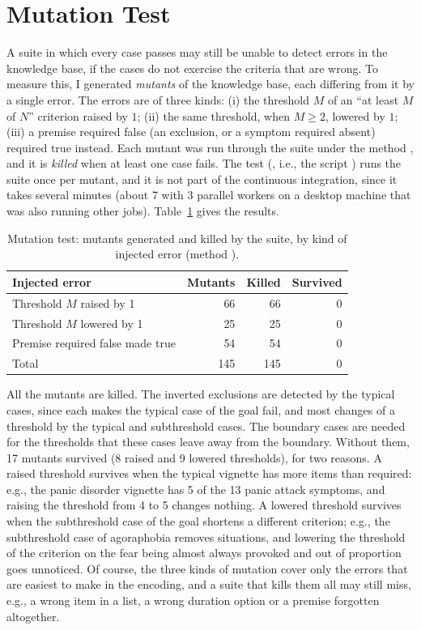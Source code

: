 \section{Mutation Test}
\label{sec:mutation}

A suite in which every case passes may still be unable to detect errors in the
knowledge base, if the cases do not exercise the criteria that are wrong. To
measure this, I generated \emph{mutants} of the knowledge base, each differing
from it by a single error. The errors are of three kinds: (i) the threshold $M$
of an ``at least $M$ of $N$'' criterion raised by $1$; (ii) the same threshold,
when $M \ge 2$, lowered by $1$; (iii) a premise required false (an exclusion, or
a symptom required absent) required true instead. Each mutant was run through
the suite under the method , and it is \emph{killed} when at least one
case fails. The test (, i.e., the script )
runs the suite once per mutant, and it is not part of the continuous
integration, since it takes several minutes (about 7 with 3 parallel workers on
a desktop machine that was also running other jobs).
Table~\ref{tab:mutation} gives the results.

\begin{table}[ht]
\centering
\caption{Mutation test: mutants generated and killed by the suite, by kind of
injected error (method ).}
\label{tab:mutation}
\small
\begin{tabular}{@{}lrrr@{}}
\toprule
\textbf{Injected error} & \textbf{Mutants} & \textbf{Killed} & \textbf{Survived} \\
\midrule
Threshold $M$ raised by 1 & 66 & 66 & 0 \\
Threshold $M$ lowered by 1 & 25 & 25 & 0 \\
Premise required false made true & 54 & 54 & 0 \\
\midrule
Total & 145 & 145 & 0 \\
\bottomrule
\end{tabular}
\end{table}

All the mutants are killed. The inverted exclusions are detected by the typical
cases, since each makes the typical case of the goal fail, and most changes of a
threshold by the typical and subthreshold cases. The boundary cases are needed
for the thresholds that these cases leave away from the boundary. Without them,
17 mutants survived (8 raised and 9 lowered thresholds), for two reasons. A
raised threshold survives when the typical vignette has more items than
required: e.g., the panic disorder vignette has 5 of the 13 panic attack
symptoms, and raising the threshold from 4 to 5 changes nothing. A lowered
threshold survives when the subthreshold case of the goal shortens a different
criterion; e.g., the subthreshold case of agoraphobia removes situations, and
lowering the threshold of the criterion on the fear being almost always provoked
and out of proportion goes unnoticed. Of course, the three kinds of mutation
cover only the errors that are easiest to make in the encoding, and a suite that
kills them all may still miss, e.g., a wrong item in a list, a wrong duration
option or a premise forgotten altogether.
